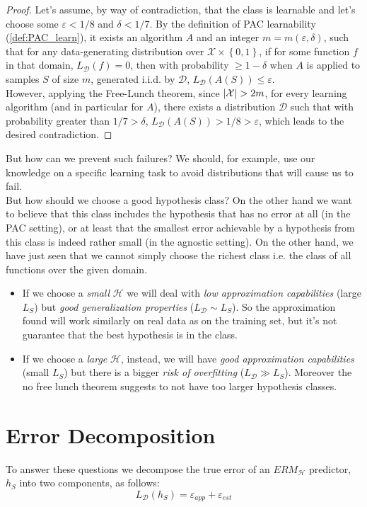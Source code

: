\documentclass[12pt]{report}
\theoremstyle{plain}
\newcommand\mcl[1]{\mathcal{#1}}
\begin{document}
\begin{flushleft}
\begin{proof}
	Let's assume, by way of contradiction, that the class is learnable and let's choose some $\varepsilon <1/8$ and $\delta <1/7$. By the definition of PAC learnability (\ref{def:PAC_learn}), it exists an algorithm $A$ and an integer $m=m(\varepsilon,\delta)$, such that for any data-generating distribution over $\mcl{X}\times\left\{0,1\right\}$, if for some function $f$ in that domain, $L_\mcl{D}(f)=0$, then with probability $\geq 1-\delta$ when $A$ is applied to samples $S$ of size $m$, generated i.i.d. by $\mcl{D}$, $L_\mcl{D}(A(S))\leq\varepsilon$.\\
	However, applying the Free-Lunch theorem, since $\abs{\mcl{X}}>2m$, for every learning algorithm (and in particular for $A$), there exists a distribution $\mcl{D}$ such that with probability greater than $1/7 >\delta$, $L_\mcl{D}(A(S)) >1/8 >\varepsilon$, which leads to the desired contradiction.
\end{proof}

But how can we prevent such failures? We should, for example, use our knowledge on a specific learning task to avoid distributions that will cause us to fail.\\
But how should we choose a good hypothesis class? On the other hand we want to believe that this class includes the hypothesis that has no error at all (in the PAC setting), or at least that the smallest error achievable by a hypothesis from this class is indeed rather small (in the agnostic setting). On the other hand, we have just seen that we cannot simply choose the richest class i.e. the class of all functions over the given domain.\\
\begin{itemize}
	\item If we choose a \textit{small} $\mcl{H}$ we will deal with \textit{low approximation capabilities} (large $L_S$) but \textit{good generalization properties} ($L_\mcl{D}\sim L_S$). So the approximation found will work similarly on real data as on the training set, but it's not guarantee that the best hypothesis is in the class.
	\item If we choose a \textit{large} $\mcl{H}$, instead, we will have \textit{good approximation capabilities} (small $L_S$) but there is a bigger \textit{risk of overfitting} ($L_\mcl{D}\gg L_S$). Moreover the no free lunch theorem suggests to not have too larger hypothesis classes.
\end{itemize}

\section{Error Decomposition}
\label{sec:err_dec}
To answer these questions we decompose the true error of an $ERM_\mcl{H}$ predictor, $h_S$ into two components, as follows:
\[ L_\mcl{D}(h_S)=\varepsilon_{app}+\varepsilon_{est} \]


\end{flushleft}
\end{document}
